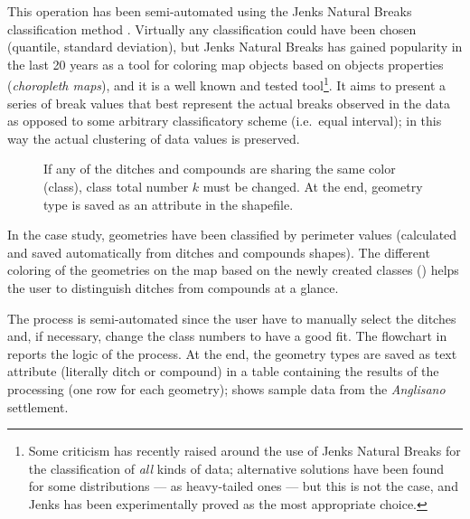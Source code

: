             This operation has been semi-automated using the Jenks Natural Breaks classification method \cite{jenks1977}. Virtually any classification could have been chosen (quantile, standard deviation), but Jenks Natural Breaks has gained popularity in the last 20 years as a tool for coloring map objects based on objects properties (\emph{choropleth maps}), and it is a well known and tested tool\footnote{Some criticism has recently raised around the use of Jenks Natural Breaks for the classification of \emph{all} kinds of data; alternative solutions have been found for some distributions --- as heavy-tailed ones \cite{jenks-tail} --- but this is not the case, and Jenks has been experimentally proved as the most appropriate choice.}. It aims to present a series of break values that best represent the actual breaks observed in the data as opposed to some arbitrary classificatory scheme (i.e.\ equal interval); in this way the actual clustering of data values is preserved.

            \begin{wrapfigure}{l}{0.5\textwidth}
                \centering
                \vspace{-0.03\textheight}
                \begin{tikzpicture}[x=1mm,y=1mm,scale=0.005]
                    
                \end{tikzpicture}
                \caption[Flow chart: the logic of bulk distinguishing ditches and compounds]{If any of the ditches and compounds are sharing the same color (class), class total number $k$ must be changed. At the end, geometry type is saved as an attribute in the shapefile.}
                \label{fig:flow-map}
                \vspace{-0.03\textheight}
            \end{wrapfigure}

            In the case study, geometries have been classified by perimeter values (calculated and saved automatically from ditches and compounds shapes). The different coloring of the geometries on the map based on the newly created classes () helps the user to distinguish ditches from compounds at a glance.

            The process is semi-automated since the user have to manually select the ditches and, if necessary, change the class numbers to have a good fit. The flowchart in  reports the logic of the process. At the end, the geometry types are saved as text attribute (literally \textsf{ditch} or \textsf{compound}) in a table containing the results of the processing (one row for each geometry);  shows sample data from the \emph{Anglisano} settlement.

